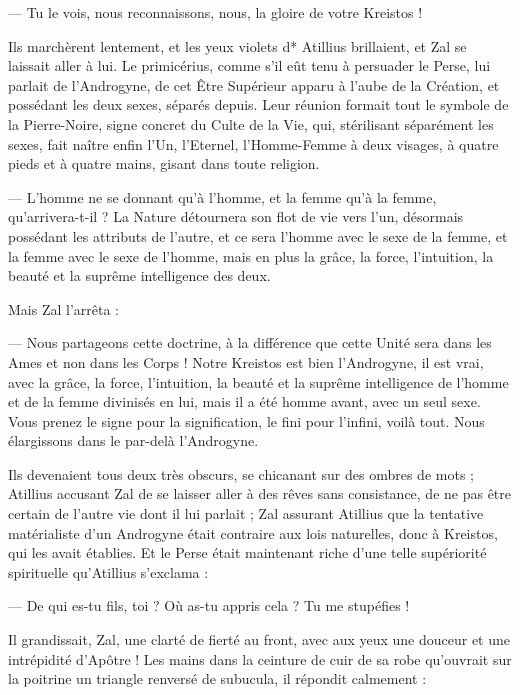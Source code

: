 \documentclass[a4paper, 11pt, oneside, polutonikogreek, french]{article}
\begin{document}
--- Tu le vois, nous reconnaissons, nous, la gloire de votre Kreistos !

Ils marchèrent lentement, et les yeux violets d* Atillius brillaient, et Zal se laissait aller à lui. Le primicérius, comme s'il eût tenu à persuader le Perse, lui parlait de l'Androgyne, de cet Être Supérieur apparu à l'aube de la Création, et possédant les deux sexes, séparés depuis. Leur réunion formait tout le symbole de la Pierre-Noire, signe concret du Culte de la Vie, qui, stérilisant séparément les sexes, fait naître enfin l'Un, l'Eternel, l'Homme-Femme à deux visages, à quatre pieds et à quatre mains, gisant dans toute religion.

--- L'homme ne se donnant qu'à l'homme, et la femme qu'à la femme, qu'arrivera-t-il ? La Nature détournera son flot de vie vers l'un, désormais possédant les attributs de l'autre, et ce sera l'homme avec le sexe de la femme, et la femme avec le sexe de l'homme, mais en plus la grâce, la force, l'intuition, la beauté et la suprême intelligence des deux.

Mais Zal l'arrêta :

--- Nous partageons cette doctrine, à la différence que cette Unité sera dans les Ames et non dans les Corps ! Notre Kreistos est bien l'Androgyne, il est vrai, avec la grâce, la force, l'intuition, la beauté et la suprême intelligence de l'homme et de la femme divinisés en lui, mais il a été homme avant, avec un seul sexe. Vous prenez le signe pour la signification, le fini pour l'infini, voilà tout. Nous élargissons dans le par-delà l'Androgyne.

Ils devenaient tous deux très obscurs, se chicanant sur des ombres de mots ; Atillius accusant Zal de se laisser aller à des rêves sans consistance, de ne pas être certain de l'autre vie dont il lui parlait ; Zal assurant Atillius que la tentative matérialiste d'un Androgyne était contraire aux lois naturelles, donc à Kreistos, qui les avait établies. Et le Perse était maintenant riche d'une telle supériorité spirituelle qu'Atillius s'exclama :

--- De qui es-tu fils, toi ? Où as-tu appris cela ? Tu me stupéfies !

Il grandissait, Zal, une clarté de fierté au front, avec aux yeux une douceur et une intrépidité d'Apôtre ! Les mains dans la ceinture de cuir de sa robe qu'ouvrait sur la poitrine un triangle renversé de subucula, il répondit calmement :
\end{document}
